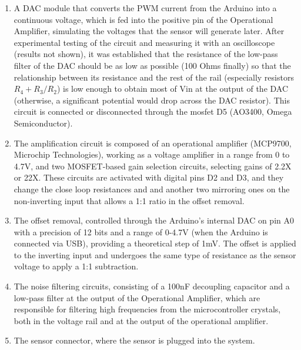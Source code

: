\documentclass[conference]{IEEEtran}
\begin{document}
         \begin{enumerate}
            \item A DAC module that converts the PWM current from the Arduino into a continuous voltage, which is fed into the positive 
               pin of the Operational Amplifier, simulating the voltages that the sensor will generate later. After experimental testing of
               the circuit and measuring it with an oscilloscope (results not shown), it was established that the resistance of the low-pass
               filter of the DAC should be as low as possible (100 Ohms finally) so that the relationship between its resistance and the
               rest of the rail (especially resistors $R_4 + {R_3} / {R_2}$) is low enough to obtain most of Vin at the output of the
               DAC (otherwise, a significant potential would drop across the DAC resistor). This circuit is connected or disconnected
               through the mosfet D5 (AO3400, Omega Semiconductor).

            \item The amplification circuit is composed of an operational amplifier (MCP9700, Microchip Technologies), working as a voltage amplifier in a range from 0 to 4.7V, and two MOSFET-based
               gain selection circuits, selecting gains of 2.2X or 22X. These circuits are activated with digital pins D2 and D3, and they change the close loop resistances
               and and another two mirroring ones on the non-inverting input that allows a 1:1 ratio in the offset removal.

            \item The offset removal, controlled through the Arduino's internal DAC on pin A0 with a precision of 12 bits and a range of 0-4.7V
               (when the Arduino is connected via USB), providing a theoretical step of 1mV. The offset is applied to the inverting input and undergoes
               the same type of resistance as the sensor voltage to apply a 1:1 subtraction.

            \item The noise filtering circuits, consisting of a 100nF decoupling capacitor and a low-pass filter at the output of the Operational
               Amplifier, which are responsible for filtering high frequencies from the microcontroller crystals, both in the voltage rail and at
               the output of the operational amplifier.

            \item The sensor connector, where the sensor is plugged into the system.
         \end{enumerate}
\end{document}
